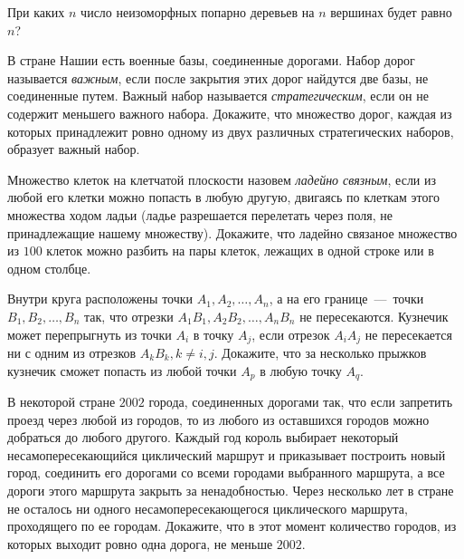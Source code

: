 \begin{exersize}
	При каких $n$ число неизоморфных попарно деревьев на $n$ вершинах будет равно $n$?
\end{exersize} 


\begin{exersize}
	В стране Нашии есть военные базы, соединенные дорогами. Набор дорог называется \emph{важным}, если после закрытия этих дорог 
	найдутся две базы, не соединенные путем. Важный набор называется \emph{стратегическим}, если он не содержит меньшего важного набора. 
	Докажите, что множество дорог, каждая из которых принадлежит ровно одному из двух различных стратегических наборов, образует важный набор.
\end{exersize}	

\begin{exersize}
	Множество клеток на клетчатой плоскости назовем \emph{ладейно связным}, если из любой его клетки можно попасть в любую другую, 
	двигаясь по клеткам этого множества ходом ладьи (ладье разрешается перелетать через поля, не принадлежащие нашему множеству). 
	Докажите, что ладейно связаное множество из $100$ клеток можно разбить на пары клеток, лежащих в одной строке или в одном столбце.
\end{exersize}	

\begin{exersize}
	Внутри круга расположены точки $A_1, A_2, \dots, A_n$, а на его границе~---~точки $B_1, B_2, \dots, B_n$ так, что отрезки 
	$A_1B_1, A_2B_2, \dots, A_nB_n$ не пересекаются. Кузнечик может перепрыгнуть из точки $A_i$ в точку $A_j$, если отрезок $A_iA_j$ 
	не пересекается ни с одним из отрезков $A_kB_k, k \neq i, j$. Докажите, что за несколько прыжков кузнечик сможет попасть 
	из любой точки $A_p$ в любую точку $A_q$.
\end{exersize}	

\begin{exersize}
	В некоторой стране $2002$ города, соединенных дорогами так, что если запретить проезд через любой из городов, 
	то из любого из оставшихся городов можно добраться до любого другого. Каждый год король выбирает некоторый несамопересекающийся 
	циклический маршрут и приказывает построить новый город, соединить его дорогами со всеми городами выбранного маршрута, а все дороги 
	этого маршрута закрыть за ненадобностью. Через несколько лет в стране не осталось ни одного несамопересекающегося циклического маршрута, 
	проходящего по ее городам. Докажите, что в этот момент количество городов, из которых выходит ровно одна дорога, не меньше $2002$.
\end{exersize}	 